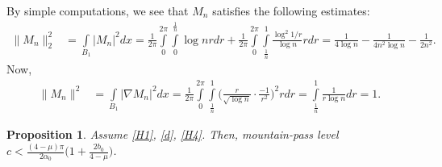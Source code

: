 \documentclass[11pt]{amsart}
\numberwithin{equation}{section}
\newtheorem{prop}[thm]{Proposition}
\newcommand{\1}{\frac{1}{2}}
\begin{document}
	By simple computations, we see that $M_n$ satisfies the following estimates:
	\begin{align*}
		\|M_n\|^2_2 &= \int\limits_{B_1} |M_n|^2 dx= \frac{1}{2\pi} \int\limits_0^{2\pi} \int\limits_0^{\frac{1}{n}} \log{n}r dr + \frac{1}{2\pi}\int\limits_0^{2\pi} \int\limits_{\frac{1}{n}}^1 \frac{\log^2{1/r}}{\log{n}}rdr=  \frac{1}{4\log{n}}-\frac{1}{4n^2\log{n}}- \frac{1}{2n^2}.
	\end{align*}
	Now,
	\begin{align*}
		\|M_n\|^2 &= \int\limits_{B_1} |\nabla M_n|^2 dx= \frac{1}{2\pi} \int\limits_0^{2\pi} \int\limits_{\frac{1}{n}}^1 \Bigg( \frac{r}{\sqrt{\log{n}}} \cdot \frac{-1}{r^2}\Bigg)^2 r dr =  \int\limits_{\frac{1}{n}}^1 \frac{1}{r\log{n}}dr = 1.
	\end{align*}
	\begin{prop}
		\label{prop5}
		Assume \eqref{H1}, \eqref{d}, \eqref{H4}. Then, mountain-pass level $c< \frac{(4-\mu)\pi}{2\alpha_0}\Big( 1+ \frac{2b_0}{4-\mu}\Big)$.
	\end{prop}
\end{document}
